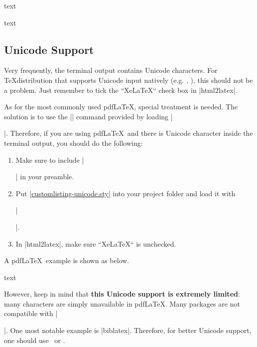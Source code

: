 \documentclass[letterpaper, 11pt, DIV=11]{scrartcl}
\begin{document}
\begin{tcbsrccode}{text}

\end{tcbsrccode}



\begin{tcbsrccode}{text}

\end{tcbsrccode}


\subsection{Unicode Support}

Very frequently, the terminal output contains Unicode characters. For \TeX distribution that supports Unicode input natively (e.g. \XeLaTeX, \LuaLaTeX), this should not be a problem. Just remember to tick the ``XeLaTeX`` check box in \rawinline|html2latex|.


As for the most commonly used pdf\LaTeX, special treatment is needed. The solution is to use the \texinline|\unichar| command provided by loading \texinline|\usepackage[utf8x]{inputenc}|. Therefore, if you are using pdf\LaTeX\ and there is Unicode character inside the terminal output, you should do the following:

\begin{enumerate}
\item Make sure to include \texinline|\usepackage[utf8x]{inputenc}| in your preamble.
\item Put \href{https://github.com/xziyue/latex-beautiful-listings-screenshot/blob/master/customlisting-unicode.sty}{\rawinline|customlisting-unicode.sty|} into your project folder and load it with 

\texinline|\usepackage{customlisting-unicode}|.
\item In \rawinline|html2latex|, make sure ``XeLaTeX`` is unchecked.
\end{enumerate}

A pdf\LaTeX\ example is shown as below. 

\begin{tcbsrccode}{text}

\end{tcbsrccode}


However, keep in mind that \textbf{this Unicode support is extremely limited}: many characters are simply unavailable in pdf\LaTeX. Many packages are not compatible with \texinline|\usepackage[utf8x]{inputenc}|. One most notable example is \rawinline|biblatex|. Therefore, for better Unicode support, one should use \XeLaTeX\ or \LuaLaTeX.
\end{document}
